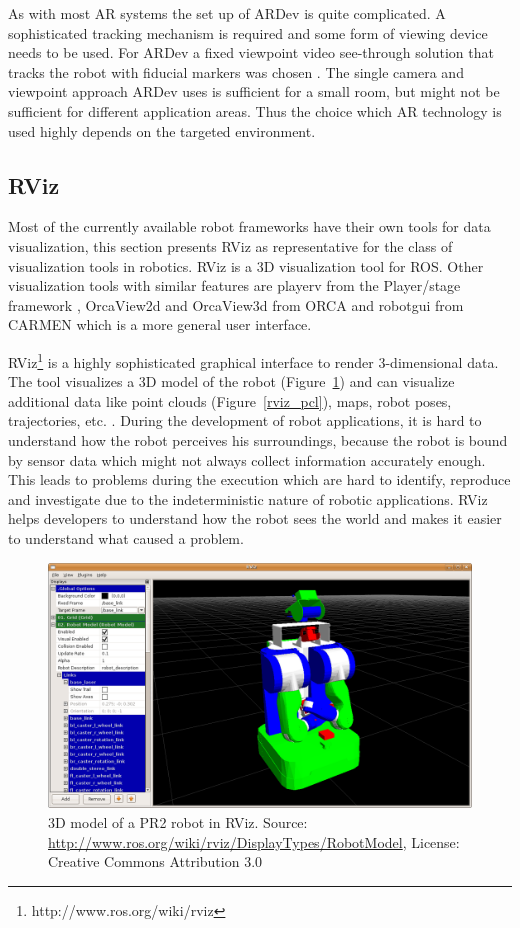 As with most AR systems the set up of ARDev is quite complicated. A sophisticated tracking mechanism is required and some form of viewing device needs to be used. For ARDev a fixed viewpoint video see-through solution that tracks the robot with fiducial markers was chosen \cite{Collett2010}. The single camera and viewpoint approach ARDev uses is sufficient for a small room, but might not be sufficient for different application areas. Thus the choice which AR technology is used highly depends on the targeted environment.

\subsection{RViz}
\label{rviz}
Most of the currently available robot frameworks have their own tools for data visualization, this section presents RViz as representative for the class of visualization tools in robotics. RViz is a 3D visualization tool for ROS. Other visualization tools with similar features are playerv from the Player/stage framework \cite{Gerkey2003}, OrcaView2d and OrcaView3d from ORCA \cite{Makarenko2006} and robotgui from CARMEN \cite{Montemerlo2003} which is a more general user interface.

RViz\footnote{http://www.ros.org/wiki/rviz} is a highly sophisticated graphical interface to render 3-dimensional data. The tool visualizes a 3D model of the robot (Figure~\ref{rviz_model}) and can visualize additional data like point clouds (Figure~\ref{rviz_pcl}), maps, robot poses, trajectories, etc. \cite{Quigley2009}. During the development of robot applications, it is hard to understand how the robot perceives his surroundings, because the robot is bound by sensor data which might not always collect information accurately enough. This leads to problems during the execution which are hard to identify, reproduce and investigate due to the indeterministic nature of robotic applications. RViz helps developers to understand how the robot sees the world and makes it easier to understand what caused a problem.

\begin{figure}[htbp]
  \centering
  \includegraphics[scale=0.3]{img/RVizRobotModel.png}
  \caption{3D model of a PR2 robot in RViz. Source: \url{http://www.ros.org/wiki/rviz/DisplayTypes/RobotModel}, License: Creative Commons Attribution 3.0}
  \label{rviz_model}
\end{figure}

